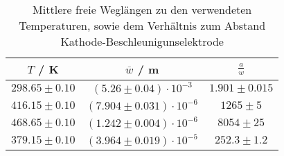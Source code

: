 \begin{table}[!htp]
\centering
\caption{Mittlere freie Weglängen zu den verwendeten Temperaturen, sowie dem Verhältnis zum Abstand Kathode-Beschleunigunselektrode }
\label{tab:weglaenge}
\begin{tabular}{c c c}
\toprule
{{$T$ / K}} & {{$\overline{w}$ / m}} & {{$\frac{a}{w}$}} \\
\midrule
$298.65 \pm 0.10$ & $(5.26 \pm 0.04) \cdot 10^{-3}  $ &  $ 1.901 \pm 0.015 $\\
$416.15 \pm 0.10$ & $(7.904 \pm 0.031)\cdot 10^{-6} $  & $  1265 \pm 5$ \\
$468.65 \pm 0.10$ & $(1.242 \pm 0.004)\cdot 10^{-6} $  & $  8054 \pm 25 $ \\
$379.15 \pm 0.10$ & $(3.964 \pm0.019)\cdot 10^{-5}  $ &  $ 252.3 \pm 1.2 $ \\
\bottomrule
\end{tabular}
\end{table}